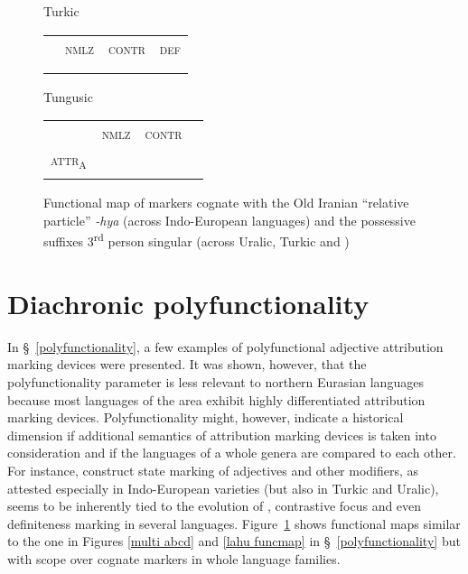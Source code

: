 {\begin{figure}
\parbox[b]{0.5\textwidth}{
\begin{center}Turkic\\
\medskip
\begin{tabular}{| m{1.4cm} || m{.9cm} | m{1.1cm} | m{.7cm} |}
\cline{1-1}
\\
\cline{1-1}
\\
\hline
 & \textsc{nmlz} & \textsc{contr} & \textsc{def}\\
\hline
\\
\cline{1-1}
\\
\cline{1-1}
\end{tabular}
\end{center}
}
\parbox[b]{0.5\textwidth}{
\begin{center}Tungusic\\
\medskip
\begin{tabular}{| m{1.4cm} || m{.9cm} | m{1.1cm} | m{.7cm} |}
\cline{1-1}
\\
\cline{1-1}
\\
\hline
 & \textsc{nmlz} & \textsc{contr} & \\
\hline
\textsc{attr}$_{\text{A}}$\\
\cline{1-1}
\\
\cline{1-1}
\end{tabular}
\end{center}
}
\caption[Functional map of cognate devices]{Functional map of markers cognate with the Old Iranian “relative particle” \textit{-hya} (across Indo-European languages) and the possessive suffixes 3\textsuperscript{rd} person singular (across Uralic, Turkic and )}
\label{ie-ural funcmap}
\end{figure}

\section{Diachronic polyfunctionality}
In \S~\ref{polyfunctionality}, a few examples of polyfunctional adjective attribution marking devices were presented. It was shown, however, that the polyfunctionality parameter is less relevant to northern Eurasian languages because most languages of the area exhibit highly differentiated attribution marking devices. Polyfunctionality might, however, indicate a historical dimension if additional semantics of attribution marking devices is taken into consideration and if the languages of a whole genera are compared to each other. For instance, construct state marking of adjectives and other modifiers, as attested especially in Indo-European varieties (but also in Turkic and Uralic), seems to be inherently tied to the evolution of , contrastive focus and even definiteness marking in several languages. Figure~\ref{ie-ural funcmap} shows functional maps similar to the one in Figures \ref{multi abcd} and \ref{lahu funcmap} in \S~\ref{polyfunctionality} but with scope over cognate markers in whole language families.

}
